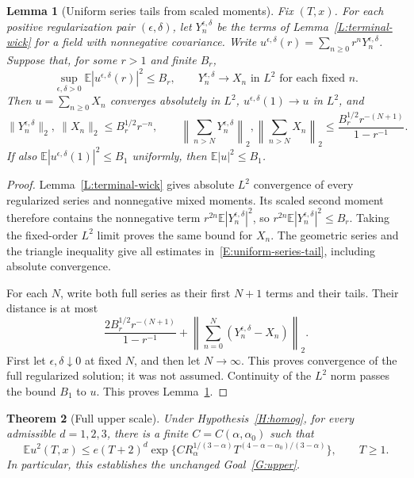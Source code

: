\documentclass[12pt]{article}
\numberwithin{equation}{section}
\newtheorem{theorem}{Theorem}[section]
\newtheorem{lemma}[theorem]{Lemma}
\theoremstyle{definition}
\newcommand{\E}{\mathbb{E}}
\begin{document}
\begin{lemma}[Uniform series tails from scaled moments]\label{L:uniform-series-tail}
  Fix $(T,x)$. For each positive regularization pair $(\epsilon,\delta)$,
  let $Y_n^{\epsilon,\delta}$ be the terms of
  Lemma~\ref{L:terminal-wick} for a field with nonnegative covariance.
  Write $u^{\epsilon,\delta}(r)=\sum_{n\ge0}r^nY_n^{\epsilon,\delta}$.
  Suppose that, for some $r>1$ and finite $B_r$,
  \[
    \sup_{\epsilon,\delta>0}
    \E|u^{\epsilon,\delta}(r)|^2\le B_r,
    \qquad
    Y_n^{\epsilon,\delta}\longrightarrow X_n
    \text{ in }L^2\text{ for each fixed }n.
  \]
  Then $u=\sum_{n\ge0}X_n$ converges absolutely in $L^2$,
  $u^{\epsilon,\delta}(1)\to u$ in $L^2$, and
  \begin{equation}\label{E:uniform-series-tail}
    \|Y_n^{\epsilon,\delta}\|_2,\ \|X_n\|_2
    \le B_r^{1/2}r^{-n},\qquad
    \left\|\sum_{n>N}Y_n^{\epsilon,\delta}\right\|_2,
    \left\|\sum_{n>N}X_n\right\|_2
    \le\frac{B_r^{1/2}r^{-(N+1)}}{1-r^{-1}}.
  \end{equation}
  If also $\E|u^{\epsilon,\delta}(1)|^2\le B_1$ uniformly, then
  $\E|u|^2\le B_1$.
\end{lemma}

\begin{proof}
  Lemma~\ref{L:terminal-wick} gives absolute $L^2$ convergence of every
  regularized series and nonnegative mixed moments.
  Its scaled second moment therefore contains the nonnegative term
  $r^{2n}\E|Y_n^{\epsilon,\delta}|^2$, so
  $r^{2n}\E|Y_n^{\epsilon,\delta}|^2\le B_r$.
  Taking the fixed-order $L^2$ limit proves the same bound for $X_n$.
  The geometric series and the triangle inequality give all estimates
  in~\eqref{E:uniform-series-tail}, including absolute convergence.

  For each $N$, write both full series as their first $N+1$ terms
  and their tails. Their distance is at most
  \[
    \frac{2B_r^{1/2}r^{-(N+1)}}{1-r^{-1}}
    +\left\|\sum_{n=0}^N(Y_n^{\epsilon,\delta}-X_n)\right\|_2.
  \]
  First let $\epsilon,\delta\downarrow0$ at fixed $N$, and then let
  $N\to\infty$. This proves convergence of the full regularized solution;
  it was not assumed. Continuity of the $L^2$ norm passes the bound
  $B_1$ to $u$. This proves Lemma~\ref{L:uniform-series-tail}.
\end{proof}

\begin{theorem}[Full upper scale]\label{T:full-upper}
  Under Hypothesis~\ref{H:homog}, for every admissible $d=1,2,3$,
  there is a finite $C=C(\alpha,\alpha_0)$ such that
  \begin{equation}\label{E:full-upper-bound}
    \E u^2(T,x)
    \le e(T+2)^d
    \exp\{C R_\alpha^{1/(3-\alpha)}
    T^{(4-\alpha-\alpha_0)/(3-\alpha)}\},\qquad T\ge1.
  \end{equation}
  In particular, this establishes the unchanged Goal~\ref{G:upper}.
\end{theorem}
\end{document}
